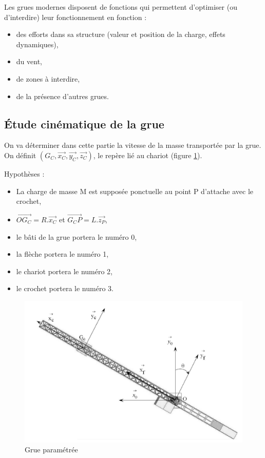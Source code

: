 Les grues modernes disposent de fonctions qui permettent d'optimiser (ou d'interdire) leur fonctionnement en fonction :
\begin{itemize}
 \item des efforts dans sa structure (valeur et position de la charge, effets dynamiques),
 \item du vent,
 \item de zones à interdire,
 \item de la présence d'autres grues.
\end{itemize}

\subsection{Étude cinématique de la grue}

On va déterminer dans cette partie la vitesse de la masse transportée par la grue.
On définit $(G_C,\overrightarrow{x_C}, \overrightarrow{y_C}, \overrightarrow{z_C})$, le repère lié au chariot (figure \ref{img:grue2}).

Hypothèses :
\begin{itemize}
 \item La charge de masse M est supposée ponctuelle au point P d'attache avec le crochet,
 \item $\overrightarrow{OG_C}=R.\overrightarrow{x_C}$ et $\overrightarrow{G_CP}=L.\overrightarrow{z_P}$,
 \item le bâti de la grue portera le numéro 0,
 \item la flèche portera le numéro 1,
 \item le chariot portera le numéro 2,
 \item le crochet portera le numéro 3.
 \end{itemize}

\begin{figure}[!h]
  \centering\includegraphics[width=0.8\linewidth]{img/grue2.png}
  \caption{Grue paramétrée}
  \label{img:grue2}
\end{figure}

